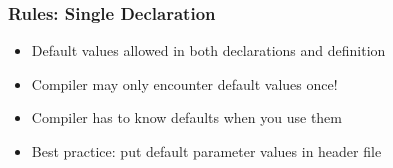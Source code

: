 \documentclass{../ucll-slides}
\begin{document}
\begin{frame}
  \frametitle{Rules: Single Declaration}
  \begin{itemize}
    \item Default values allowed in both declarations and definition
    \item Compiler may only encounter default values once!
    \item Compiler has to know defaults when you use them
    \item Best practice: put default parameter values in header file
  \end{itemize}
  \vskip5mm
  \begin{overprint}
  \end{overprint}
\end{frame}
\end{document}

